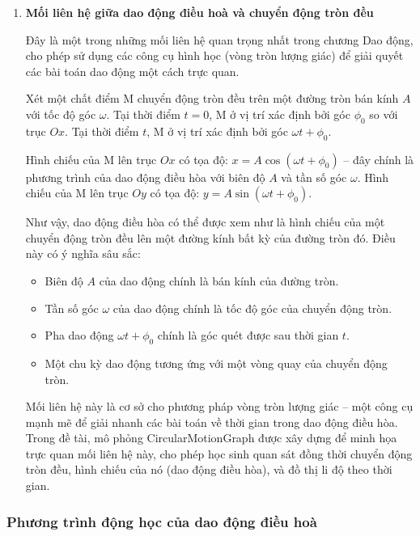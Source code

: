 \begin{enumerate}[label=\alph*)]
    \item \textbf{Mối liên hệ giữa dao động điều hoà và chuyển động tròn đều}

    Đây là một trong những mối liên hệ quan trọng nhất trong chương Dao động, cho phép sử dụng các công cụ hình học (vòng tròn lượng giác) để giải quyết các bài toán dao động một cách trực quan.

    Xét một chất điểm M chuyển động tròn đều trên một đường tròn bán kính $A$ với tốc độ góc $\omega$. Tại thời điểm $t = 0$, M ở vị trí xác định bởi góc $\phi_0$ so với trục $Ox$. Tại thời điểm $t$, M ở vị trí xác định bởi góc $\omega t + \phi_0$.

    Hình chiếu của M lên trục $Ox$ có tọa độ: $x = A\cos(\omega t + \phi_0)$ – đây chính là phương trình của dao động điều hòa với biên độ $A$ và tần số góc $\omega$. Hình chiếu của M lên trục $Oy$ có tọa độ: $y = A\sin(\omega t + \phi_0)$.

    Như vậy, dao động điều hòa có thể được xem như là hình chiếu của một chuyển động tròn đều lên một đường kính bất kỳ của đường tròn đó. Điều này có ý nghĩa sâu sắc:
    \begin{itemize}
        \item Biên độ $A$ của dao động chính là bán kính của đường tròn.
        \item Tần số góc $\omega$ của dao động chính là tốc độ góc của chuyển động tròn.
        \item Pha dao động $\omega t + \phi_0$ chính là góc quét được sau thời gian $t$.
        \item Một chu kỳ dao động tương ứng với một vòng quay của chuyển động tròn.
    \end{itemize}

    Mối liên hệ này là cơ sở cho phương pháp vòng tròn lượng giác – một công cụ mạnh mẽ để giải nhanh các bài toán về thời gian trong dao động điều hòa. Trong đề tài, mô phỏng CircularMotionGraph được xây dựng để minh họa trực quan mối liên hệ này, cho phép học sinh quan sát đồng thời chuyển động tròn đều, hình chiếu của nó (dao động điều hòa), và đồ thị li độ theo thời gian.
\end{enumerate}

\subsubsection{Phương trình động học của dao động điều hoà}

